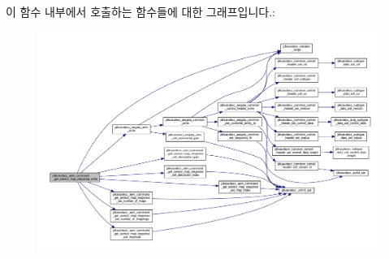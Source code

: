 이 함수 내부에서 호출하는 함수들에 대한 그래프입니다.\+:
\nopagebreak
\begin{figure}[H]
\begin{center}
\leavevmode
\includegraphics[width=350pt]{group__command__get__sensor__map__response_ga6af64ce7a35ce0aff4340d8a98eebe3c_cgraph}
\end{center}
\end{figure}


